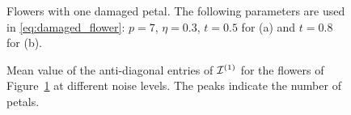 \begin{figure}[htp]
  \centering
  \caption{Flowers with one damaged petal. The following parameters
    are used in \eqref{eq:damaged_flower}: $p=7$, $\eta=0.3$,
    $t=0.5$ for (a) and $t=0.8$ for (b).}
  \label{fig:imperfect_flower}
\end{figure}

\begin{figure}[htp]
  \centering
  \caption{Mean value of the anti-diagonal entries of $\mathcal{I}^{(1)}$ for the flowers of
    Figure~\ref{fig:imperfect_flower} at different noise levels. The peaks indicate the number of petals.}
  \label{fig:matching_imperfect_flower}
\end{figure}

